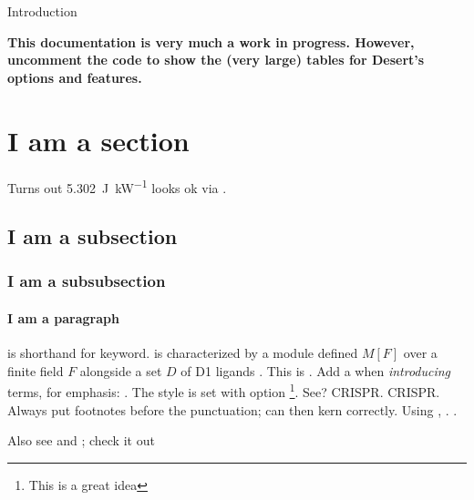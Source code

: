 
\begin{MainChapter}{Introduction}


\textbf{This documentation is very much a work in progress. However, uncomment the code  to show the (very large) tables for Desert's options and features.}

\section{I am a section}

Turns out \qty{5.302}{\joule\per\kilo\watt} looks ok via .

\subsection{I am a subsection}

\subsubsection{I am a subsubsection}

\paragraph*{I am a paragraph}  %
 is shorthand for keyword.
 is characterized by a module defined $M[F]$ over a finite field $F$ alongside a set $D$ of \ac{D1} ligands \cite{yolov6}.
This is .
Add a \code{*} when \emph{introducing} terms, for emphasis: .
The style is set with  option \footnote{This is a great idea}. See? \ac{CRISPR}. \ac{CRISPR}. Always put footnotes before the punctuation;  can then kern correctly.
Using , . .

Also see  and ; check it out 

\begin{ChemFigure}[
]
\end{ChemFigure}


\end{MainChapter}
